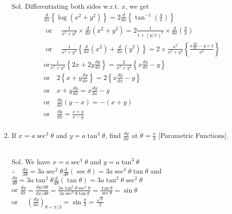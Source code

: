 \begin{enumerate}
\begin{outline}
    Sol. Differentiating both sides w.r.t. $x$, we get
$$
\begin{aligned}
& \frac{d}{d x}\left\{\log \left(x^2+y^2\right)\right\}=2 \frac{d}{d x}\left\{\tan ^{-1}\left(\frac{y}{x}\right)\right\} \\
& \text { or } \quad \frac{1}{x^2+y^2} \times \frac{d}{d x}\left(x^2+y^2\right)=2 \frac{1}{1+(y / x)^2} \times \frac{d}{d x}\left(\frac{y}{x}\right) \\
& \text { or } \quad \frac{1}{x^2+y^2}\left\{\frac{d}{d x}\left(x^2\right)+\frac{d}{d x}\left(y^2\right)\right\}=2 \times \frac{x^2}{x^2+y^2}\left\{\frac{x \frac{d y}{d x}-y \times 1}{x^2}\right\}\\
& \text{or}  \frac{1}{x^2+y^2}\left\{2 x+2 y \frac{d y}{d x}\right\}=\frac{2}{x^2+y^2}\left\{x \frac{d y}{d x}-y\right\}\\
& \text{or}  \quad 2\left\{x+y \frac{d y}{d x}\right\}=2\left\{x \frac{d y}{d x}-y\right\}\\
& \text{or}  \quad x+y \frac{d y}{d x}=x \frac{d y}{d x}-y\\
& \text{or}  \quad \frac{d y}{d x}(y-x)=-(x+y)\\
& \text{or}  \quad \frac{d y}{d x}=\frac{x+y}{x-y}\\
\end{aligned}
$$

\end{outline}


\item If $x=a \sec ^3 \theta$ and $y=a \tan ^3 \theta$, find $\frac{d y}{d x}$ at $\theta=\frac{\pi}{3}$ [Parametric Functions].\\\\

\begin{outline}
    Sol. We have $x=a \sec ^3 \theta$ and $y=a \tan ^3 \theta$\\
$\therefore \quad \frac{d x}{d \theta}=3 a \sec ^2 \theta \frac{d}{d \theta}(\sec \theta)=3 a \sec ^3 \theta \tan \theta$
and $\frac{d y}{d \theta}=3 a \tan ^2 \theta \frac{d}{d \theta}(\tan \theta)=3 a \tan ^2 \theta \sec ^2 \theta$\\
or $\frac{d y}{d x}=\frac{d y / d \theta}{d x / d \theta}=\frac{3 a \tan ^2 \theta \sec ^2 \theta}{3 a \sec ^3 \theta \tan \theta}=\frac{\tan \theta}{\sec \theta}=\sin \theta$\\
or $\quad\left(\frac{d y}{d x}\right)_{\theta=\pi / 3}=\sin \frac{\pi}{3}=\frac{\sqrt{3}}{2}$


\end{outline}
\end{enumerate}
